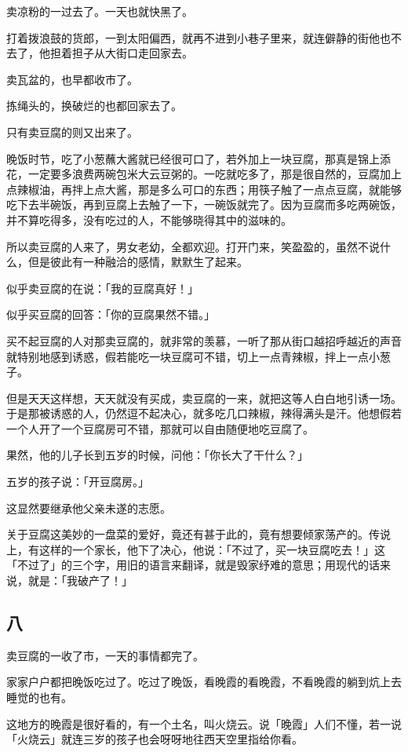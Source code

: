 \documentclass[UTF8]{ctexart}
\begin{document}
卖凉粉的一过去了。一天也就快黑了。

打着拨浪鼓的货郎，一到太阳偏西，就再不进到小巷子里来，就连僻静的街他也不去了，他担着担子从大街口走回家去。

卖瓦盆的，也早都收市了。

拣绳头的，换破烂的也都回家去了。

只有卖豆腐的则又出来了。

晚饭时节，吃了小葱蘸大酱就已经很可口了，若外加上一块豆腐，那真是锦上添花，一定要多浪费两碗包米大云豆粥的。一吃就吃多了，那是很自然的，豆腐加上点辣椒油，再拌上点大酱，那是多么可口的东西；用筷子触了一点点豆腐，就能够吃下去半碗饭，再到豆腐上去触了一下，一碗饭就完了。因为豆腐而多吃两碗饭，并不算吃得多，没有吃过的人，不能够晓得其中的滋味的。

所以卖豆腐的人来了，男女老幼，全都欢迎。打开门来，笑盈盈的，虽然不说什么，但是彼此有一种融洽的感情，默默生了起来。

似乎卖豆腐的在说：「我的豆腐真好！」

似乎买豆腐的回答：「你的豆腐果然不错。」

买不起豆腐的人对那卖豆腐的，就非常的羡慕，一听了那从街口越招呼越近的声音就特别地感到诱惑，假若能吃一块豆腐可不错，切上一点青辣椒，拌上一点小葱子。

但是天天这样想，天天就没有买成，卖豆腐的一来，就把这等人白白地引诱一场。于是那被诱惑的人，仍然逗不起决心，就多吃几口辣椒，辣得满头是汗。他想假若一个人开了一个豆腐房可不错，那就可以自由随便地吃豆腐了。

果然，他的儿子长到五岁的时候，问他：「你长大了干什么？」

五岁的孩子说：「开豆腐房。」

这显然要继承他父亲未遂的志愿。

关于豆腐这美妙的一盘菜的爱好，竟还有甚于此的，竟有想要倾家荡产的。传说上，有这样的一个家长，他下了决心，他说：「不过了，买一块豆腐吃去！」这「不过了」的三个字，用旧的语言来翻译，就是毁家纾难的意思；用现代的话来说，就是：「我破产了！」

\subsection{八}

卖豆腐的一收了市，一天的事情都完了。

家家户户都把晚饭吃过了。吃过了晚饭，看晚霞的看晚霞，不看晚霞的躺到炕上去睡觉的也有。

这地方的晚霞是很好看的，有一个土名，叫火烧云。说「晚霞」人们不懂，若一说「火烧云」就连三岁的孩子也会呀呀地往西天空里指给你看。
\end{document}
